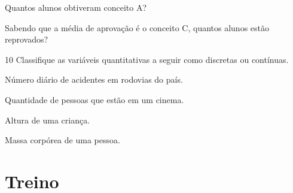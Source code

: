 \begin{escolha}
\item
  Quantos alunos obtiveram conceito A?
\item{}
\item\reduline{\mbox{}\hfill}

\item \reduline{\mbox{}\hfill}

\item
  Sabendo que a média de aprovação é o conceito C, quantos alunos estão
  reprovados?

\item{}

\item\reduline{\mbox{}\hfill}

\item\reduline{\mbox{}\hfill}
\end{escolha}

\num{10} Classifique as variáveis quantitativas a seguir como discretas
ou contínuas.


\begin{escolha}
\item
  Número diário de acidentes em rodovias do país.
\item{}

\item
  Quantidade de pessoas que estão em um cinema.
\item{}

\item
  Altura de uma criança.
\item{}

\item
  Massa corpórea de uma pessoa.
\item{}
\end{escolha}

\section{Treino}

